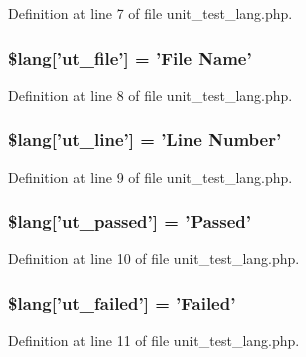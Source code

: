 Definition at line 7 of file unit\-\_\-test\-\_\-lang.\-php.

\subsubsection[{\$lang}]{\setlength{\rightskip}{0pt plus 5cm}\$lang['ut\-\_\-file'] = 'File Name'}\label{unit__test__lang_8php_aadb1d48c93ccef9a1f4e61d529f8ee80}


Definition at line 8 of file unit\-\_\-test\-\_\-lang.\-php.

\subsubsection[{\$lang}]{\setlength{\rightskip}{0pt plus 5cm}\$lang['ut\-\_\-line'] = 'Line Number'}\label{unit__test__lang_8php_aee353ee43b856ce5ec790a20ea15ef92}


Definition at line 9 of file unit\-\_\-test\-\_\-lang.\-php.

\subsubsection[{\$lang}]{\setlength{\rightskip}{0pt plus 5cm}\$lang['ut\-\_\-passed'] = 'Passed'}\label{unit__test__lang_8php_a7b1c16415de1186d294aa317d0bc864f}


Definition at line 10 of file unit\-\_\-test\-\_\-lang.\-php.

\subsubsection[{\$lang}]{\setlength{\rightskip}{0pt plus 5cm}\$lang['ut\-\_\-failed'] = 'Failed'}\label{unit__test__lang_8php_a3aefecf7c98bec69d7957cbb673a3f49}


Definition at line 11 of file unit\-\_\-test\-\_\-lang.\-php.


